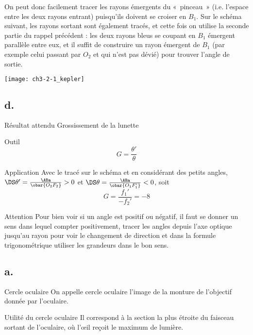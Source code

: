 \documentclass[../main/main.tex]{subfiles}
\begin{document}
On peut donc facilement tracer les rayons émergents du «~pinceau~» (i.e.
l'espace entre les deux rayons entrant) puisqu'ils doivent se croiser en $B_1$.
Sur le schéma suivant, les rayons sortant sont également tracés, et cette fois
on utilise la seconde partie du rappel précédent : les deux rayons bleus se
coupant en $B_1$ émergent parallèle entre eux, et il suffit de construire un
rayon émergent de $B_1$ (par exemple celui passant par $O_2$ et qui n'est pas
dévié) pour trouver l'angle de sortie.

\begin{center}
    \texttt{[image: ch3-2-1\_kepler]}
\end{center}

\setcounter{subsection}{1}
\subsection{d.}
\begin{tcbraster}[raster columns=6, raster equal height=rows]
    \begin{NCprop}{Résultat attendu}
        Grossissement de la lunette
    \end{NCprop}
    \begin{NCdemo}{Outil}
        \[ G = \frac{\theta'}{\theta}\]
    \end{NCdemo}
    \begin{NCexem}[raster multicolumn=2]{Application}
        Avec le tracé sur le schéma et en considérant des petits angles,
        $\DS \theta' = \frac{\ABa}{\obar{O_2F_2}} > 0$ et $\DS \theta =
        \frac{\ABa}{\obar{O_1F_1'}} < 0$, soit \[ G = \frac{f_1'}{-f_2'} = -8\]
    \end{NCexem}
    \begin{NCimpo}[raster multicolumn=2]{Attention}
        Pour bien voir si un angle est positif ou négatif, il faut se donner un
        sens dans lequel compter positivement, tracer les angles depuis l'axe
        optique jusqu'au rayon pour voir le changement de direction et dans la
        formule trigonométrique utiliser les grandeurs dans le bon sens.
    \end{NCimpo}
\end{tcbraster}

\subsection{a.}
\begin{tcbraster}[raster columns=2, raster equal height=rows]
    \begin{defi}{Cercle oculaire}
        On appelle cercle oculaire l'image de la monture de l'objectif donnée par
        l'oculaire.
    \end{defi}
    \begin{inte}{Utilité du cercle oculaire}
        Il correspond à la section la plus étroite du faisceau sortant de
        l'oculaire, où l'œil reçoit le maximum de lumière.  
    \end{inte}
\end{tcbraster}
\end{document}
